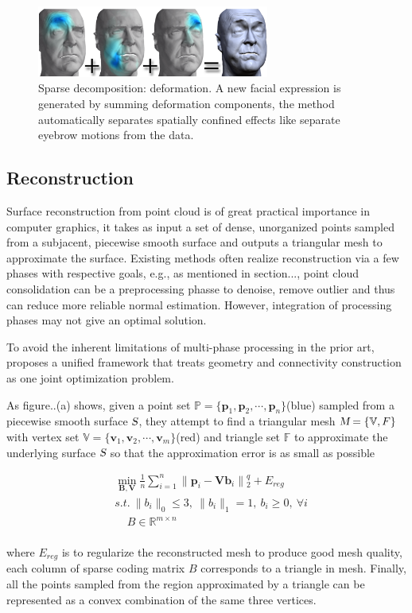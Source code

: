 \begin{figure}[ht]
  \centering
  \includegraphics[width=3in]{images/localdefor_learning}
  \caption{Sparse decomposition: deformation\cite{neumann2013sparse}. A new facial expression is generated by summing deformation components, the method automatically separates spatially confined effects like separate eyebrow motions from the data.}
\end{figure}


\subsection{Reconstruction}
\label{subsec:reconstruction}

Surface reconstruction from point cloud is of great practical importance in computer graphics,
it takes as input a set of dense, unorganized points sampled from a subjacent, piecewise smooth surface and outputs a triangular mesh to approximate the surface.
Existing methods often realize reconstruction via a few phases with respective goals, e.g., as mentioned in section..., point cloud consolidation can be a preprocessing phasse to denoise, remove outlier and thus can reduce more reliable normal estimation.
However, integration of processing phases may not give an optimal solution.

To avoid the inherent limitations of multi-phase processing in the prior art, \cite{xiong2014robust} proposes a unified framework that treats geometry and connectivity construction as one joint optimization problem.

As figure..(a) shows, given a point set $\mathbb{P}=\{ \mathbf{p}_1, \mathbf{p}_2, \cdots, \mathbf{p}_n \}$(blue) sampled from a piecewise smooth surface $\textsl{S}$,
they attempt to find a triangular mesh $\textsl{M}=\{ \mathbb{V}, \mathbb{}F\}$ with
vertex set $\mathbb{V}=\{ \mathbf{v}_1, \mathbf{v}_2, \cdots, \mathbf{v}_m \}$(red) and triangle set $\mathbb{F}$ to approximate the underlying surface $\textsl{S}$ so that the approximation error is as small as possible

\small{
\begin{equation}
 \label{eq:dictreconstruction}
 \begin{split}
 & \min_{\mathbf{B},\mathbf{V}}\frac{1}{n}\sum_{i=1}^{n}\|\mathbf{p}_{i}-\mathbf{Vb}_{i}\|{_2^{q}}+E_{reg}\\
 & s.t.~\|b_{i}\|_0\le3,~\|b_{i}\|_1=1,~b_{i}\ge0,~\forall i \\
 & ~~~~~B\in \mathbb{R}^{m\times n}
 \end{split}
\end{equation}
}
\\
where $E_{reg}$ is to regularize the reconstructed mesh to produce good mesh quality,
each column of sparse coding matrix $B$ corresponds to a triangle in mesh. Finally, all the points sampled from the region approximated by a triangle can be represented as a convex combination of the same three vertices.

